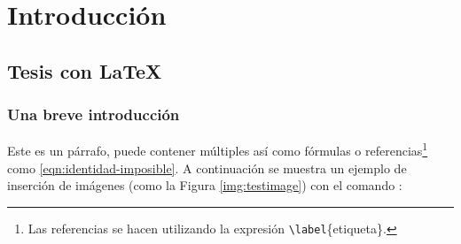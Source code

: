 %
%

\chapter{Introducción}

\section{Tesis con \LaTeX}

\lipsum[1]

\subsection{Una breve introducción}
	
	Este es un párrafo, puede contener múltiples  así como fórmulas o referencias\footnote{Las referencias se hacen utilizando la expresión \texttt{\textbackslash label}\{etiqueta\}.} como \eqref{eqn:identidad-imposible}. A continuación se muestra un ejemplo de inserción de imágenes (como la Figura \ref{img:testimage}) con el comando \href{https://latex.ppizarror.com/informe.html#hlp-imagen}{}:

		
